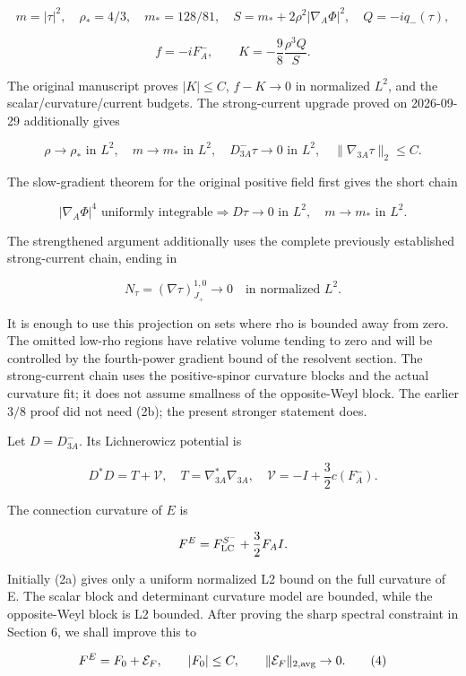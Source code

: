 \documentclass[11pt]{article}
\begin{document}
\[
 m=|\tau|^2,\quad \rho_*=4/3,\quad m_*=128/81,
 \quad S=m_*+2\rho^2|\nabla_A\Phi|^2,
 \quad Q=-iq_-(\tau),
\]

\[
 f=-iF_A^-,\qquad K=-\frac98\frac{\rho^3Q}{S}.
\]

The original manuscript proves \(|K|\le C\), \(f-K\to0\) in normalized
\(L^2\), and the scalar/curvature/current budgets. The strong-current
upgrade proved on 2026-09-29 additionally gives

\[
 \rho\to\rho_*\text{ in }L^2,\quad
 m\to m_*\text{ in }L^2,\quad
 D^-_{3A}\tau\to0\text{ in }L^2,\quad
 \|\nabla_{3A}\tau\|_2\le C.
\tag{2}
\]

The slow-gradient theorem for the original positive field first gives
the short chain

\[
 |\nabla_A\Phi|^4\text{ uniformly integrable}
 \Longrightarrow D\tau\to0\text{ in }L^2,\quad m\to m_*\text{ in }L^2.
\]

The strengthened argument additionally uses the complete previously
established strong-current chain, ending in

\[
 N_\tau=(\nabla\tau)^{1,0}_{J_+}\longrightarrow0
 \quad\text{in normalized }L^2.
\tag{2b}
\]

It is enough to use this projection on sets where rho is bounded away
from zero. The omitted low-rho regions have relative volume tending to
zero and will be controlled by the fourth-power gradient bound of the
resolvent section. The strong-current chain uses the positive-spinor
curvature blocks and the actual curvature fit; it does not assume
smallness of the opposite-Weyl block. The earlier \(3/8\) proof did not
need (2b); the present stronger statement does.

Let \(D=D^-_{3A}\). Its Lichnerowicz potential is

\[
 D^*D=T+\mathcal V,\quad
 T=\nabla_{3A}^*\nabla_{3A},\quad
 \mathcal V=-I+\frac32c(F_A^-).
\tag{3}
\]

The connection curvature of \(E\) is

\[
 F^E=F^{S^-}_{\rm LC}+\frac32F_A I.
\]

Initially (2a) gives only a uniform normalized L2 bound on the full
curvature of E. The scalar block and determinant curvature model are
bounded, while the opposite-Weyl block is L2 bounded. After proving the
sharp spectral constraint in Section 6, we shall improve this to

\[
 F^E=F_0+\mathcal E_F,\qquad |F_0|\le C,
 \qquad\|\mathcal E_F\|_{2,\rm avg}\to0.
\tag{4}
\]
\end{document}
